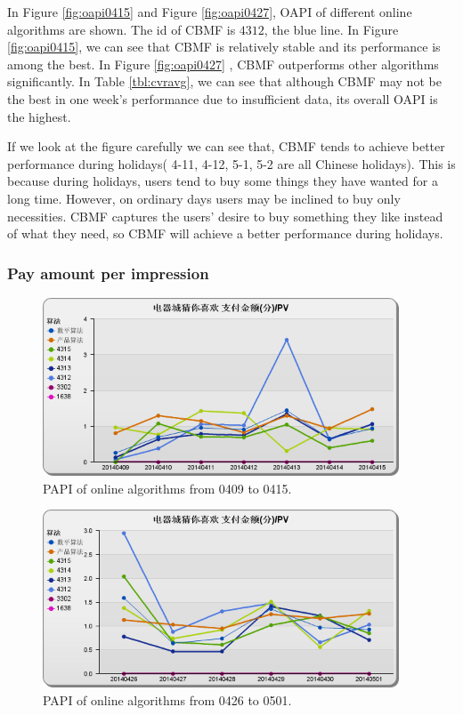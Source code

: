In Figure \ref{fig:oapi0415} and Figure \ref{fig:oapi0427}, OAPI of different online algorithms are shown. The id of CBMF is $4312$, the blue line. In Figure \ref{fig:oapi0415}, we can see that CBMF is relatively stable and its performance is among the best. In Figure \ref{fig:oapi0427} , CBMF outperforms other algorithms significantly. In Table \ref{tbl:cvravg}, we can see that although CBMF may not be the best in one week's performance due to insufficient data, its overall OAPI is the highest.

If we look at the figure carefully we can see that, CBMF tends to achieve better performance during holidays( 4-11, 4-12, 5-1, 5-2 are all Chinese holidays). This is because during holidays,  users tend to buy some things they have wanted for a long time. However, on ordinary days users may be inclined to buy only necessities. CBMF captures the users’ desire to buy something they like instead of what they need, so CBMF will achieve a better performance during holidays.

\subsubsection{Pay amount per impression}

\begin{figure}
\begin{center}

\includegraphics[width=400px]{fig/yixunexp/PAPI0415.png}
\caption{\label{fig:papi0415} PAPI of online algorithms  from 0409 to 0415.}
\end{center}
\end{figure}

\begin{figure}
\begin{center}

\includegraphics[width=400px]{fig/yixunexp/PAPI0421.png}
\caption{\label{fig:papi0501} PAPI of online algorithms  from 0426 to 0501.}
\end{center}
\end{figure}

